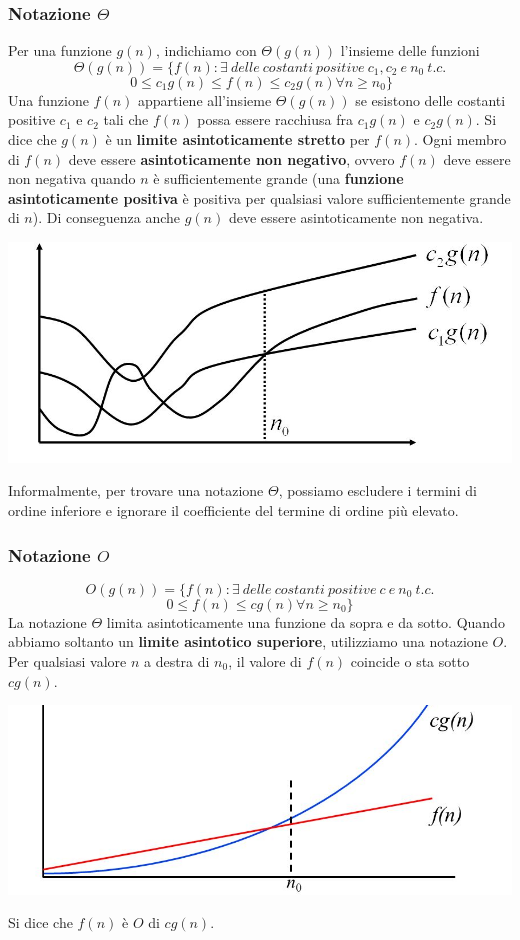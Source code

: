 \documentclass[11pt,a4paper]{article}
\begin{document}
\subsubsection{Notazione $\Theta$}
Per una funzione $g(n)$, indichiamo con $\Theta(g(n))$ l’insieme delle funzioni
\[\Theta(g(n)) = \{f(n): \exists\ delle\ costanti\ positive\ c_1, c_2\ e\ n_0\ t.c. \]
\[\ 0 \leq c_1g(n) \leq f(n) \leq c_2 g(n) \forall n \geq n_0 \} \]
%
Una funzione $f(n)$ appartiene all’insieme $\Theta(g(n))$ se esistono delle costanti positive $c_1$ e $c_2$ tali che $f(n)$ possa essere racchiusa fra $c_1 g(n)$ e $c_2 g(n)$.
Si dice che $g(n)$ è un \textbf{limite asintoticamente stretto} per $f(n)$.
Ogni membro di $f(n)$ deve essere \textbf{asintoticamente non negativo}, ovvero $f(n)$ deve essere non negativa quando $n$ è sufficientemente grande (una \textbf{funzione asintoticamente positiva} è positiva per qualsiasi valore sufficientemente grande di $n$). Di conseguenza anche $g(n)$ deve essere asintoticamente non negativa.
\begin{center}
      \includegraphics[scale=0.4]{img/teta.png}
\end{center}
Informalmente, per trovare una notazione $\Theta$, possiamo escludere i termini di ordine inferiore e ignorare il coefficiente del termine di ordine più elevato.

\subsubsection{Notazione $O$}
\[O(g(n)) = \{f(n): \exists \ delle\ costanti\ positive\ c\ e\ n_0\ t.c.\]
\[0 \leq f(n) \leq cg(n) \forall n \geq n_0 \}\]
La notazione $\Theta$ limita asintoticamente una funzione da sopra e da sotto. Quando abbiamo soltanto un \textbf{limite asintotico superiore}, utilizziamo una notazione $O$. Per qualsiasi valore $n$ a destra di $n_0$, il valore di $f(n)$ coincide o sta sotto $cg(n)$.
\begin{center}
      \includegraphics[scale=0.4]{img/ogrande.png}
\end{center}
Si dice che $f(n)$ è $O$ di $cg(n)$.
\end{document}
